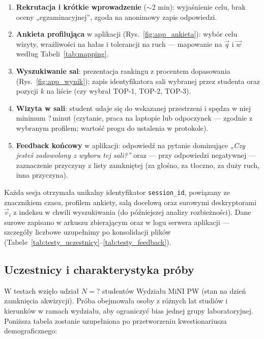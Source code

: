 \documentclass[14pt,a4paper]{extarticle}
\begin{document}
\begin{enumerate}
    \item \textbf{Rekrutacja i krótkie wprowadzenie} ($\sim$2 min): wyjaśnienie celu, brak oceny „egzaminacyjnej”, zgoda na anonimowy zapis odpowiedzi.
    \item \textbf{Ankieta profilująca} w aplikacji (Rys.~\ref{fig:app_ankieta}): wybór celu wizyty, wrażliwości na hałas i tolerancji na ruch --- mapowanie na $\vec{q}$ i $\vec{w}$ według Tabeli~\ref{tab:mapping}.
    \item \textbf{Wyszukiwanie sal}: prezentacja rankingu z procentem dopasowania (Rys.~\ref{fig:app_wynik}); zapis identyfikatora sali wybranej przez studenta oraz pozycji $k$ na liście (czy wybrał TOP-1, TOP-2, TOP-3).
    \item \textbf{Wizyta w sali}: student udaje się do wskazanej przestrzeni i spędza w niej minimum ?\,minut (czytanie, praca na laptopie lub odpoczynek --- zgodnie z wybranym profilem; wartość progu do ustalenia w protokole).
    \item \textbf{Feedback końcowy} w aplikacji: odpowiedź na pytanie dominujące \emph{„Czy jesteś zadowolony z wyboru tej sali?”} oraz --- przy odpowiedzi negatywnej --- zaznaczenie przyczyny z listy zamkniętej (za głośno, za tłoczno, za duży ruch, inna przyczyna).
\end{enumerate}

Każda sesja otrzymała unikalny identyfikator \texttt{session\_id}, powiązany ze znacznikiem czasu, profilem ankiety, salą docelową oraz surowymi deskryptorami $\vec{v}_i$ z indeksu w chwili wyszukiwania (do późniejszej analizy rozbieżności). Dane surowe zapisano w arkuszu zbierającym oraz w logu serwera aplikacji --- szczegóły liczbowe uzupełnimy po konsolidacji plików (Tabele~\ref{tab:testy_uczestnicy}--\ref{tab:testy_feedback}).

\subsection{Uczestnicy i charakterystyka próby}
W testach wzięło udział $N = \text{?}$ studentów Wydziału MiNI PW (stan na dzień zamknięcia akwizycji). Próba obejmowała osoby z różnych lat studiów i kierunków w ramach wydziału, aby ograniczyć bias jednej grupy laboratoryjnej. Poniższa tabela zostanie uzupełniona po przetworzeniu kwestionariusza demograficznego:
\end{document}
